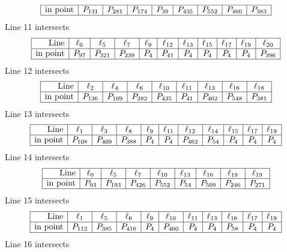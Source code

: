 \documentclass{article}
\begin{document}
{$$\begin{array}{|r*{8}{|c}|}
\hline
\mbox{in point}  & P_{131} & P_{281} & P_{174} & P_{39} & P_{435} & P_{552} & P_{460} & P_{383}\\
\hline
\end{array}
$$
Line 11 intersects 
$$
\begin{array}{|r*{10}{|c}|}
\hline
\mbox{Line}  & \ell_{0} & \ell_{5} & \ell_{7} & \ell_{9} & \ell_{12} & \ell_{13} & \ell_{15} & \ell_{17} & \ell_{19} & \ell_{20}\\
\hline
\mbox{in point}  & P_{97} & P_{321} & P_{239} & P_{4} & P_{41} & P_{4} & P_{4} & P_{4} & P_{4} & P_{396}\\
\hline
\end{array}
$$
Line 12 intersects 
$$
\begin{array}{|r*{8}{|c}|}
\hline
\mbox{Line}  & \ell_{2} & \ell_{4} & \ell_{6} & \ell_{10} & \ell_{11} & \ell_{13} & \ell_{16} & \ell_{18}\\
\hline
\mbox{in point}  & P_{136} & P_{169} & P_{282} & P_{435} & P_{41} & P_{462} & P_{548} & P_{381}\\
\hline
\end{array}
$$
Line 13 intersects 
$$
\begin{array}{|r*{10}{|c}|}
\hline
\mbox{Line}  & \ell_{1} & \ell_{3} & \ell_{8} & \ell_{9} & \ell_{11} & \ell_{12} & \ell_{14} & \ell_{15} & \ell_{17} & \ell_{19}\\
\hline
\mbox{in point}  & P_{108} & P_{409} & P_{388} & P_{4} & P_{4} & P_{462} & P_{54} & P_{4} & P_{4} & P_{4}\\
\hline
\end{array}
$$
Line 14 intersects 
$$
\begin{array}{|r*{8}{|c}|}
\hline
\mbox{Line}  & \ell_{0} & \ell_{5} & \ell_{7} & \ell_{10} & \ell_{13} & \ell_{16} & \ell_{18} & \ell_{19}\\
\hline
\mbox{in point}  & P_{93} & P_{193} & P_{426} & P_{552} & P_{54} & P_{509} & P_{246} & P_{271}\\
\hline
\end{array}
$$
Line 15 intersects 
$$
\begin{array}{|r*{10}{|c}|}
\hline
\mbox{Line}  & \ell_{1} & \ell_{5} & \ell_{6} & \ell_{9} & \ell_{10} & \ell_{11} & \ell_{13} & \ell_{16} & \ell_{17} & \ell_{19}\\
\hline
\mbox{in point}  & P_{112} & P_{385} & P_{416} & P_{4} & P_{460} & P_{4} & P_{4} & P_{58} & P_{4} & P_{4}\\
\hline
\end{array}
$$
Line 16 intersects 
$$
\begin{array}{|r*{8}{|c}|}

\end{array}$$}
\end{document}
